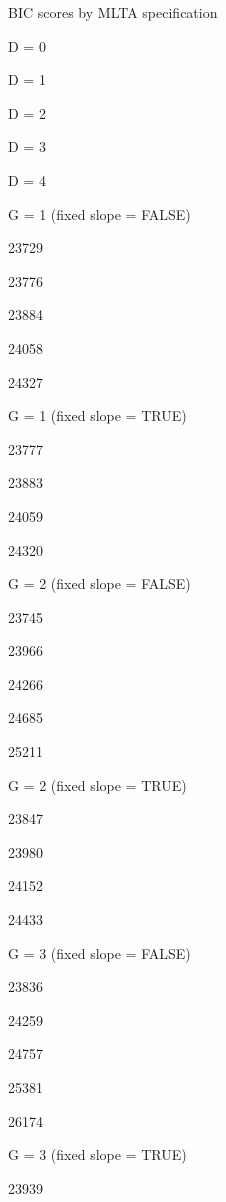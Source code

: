 \documentclass[
]{article}
\newenvironment{Shaded}{\begin{snugshade}}{\end{snugshade}}
\newcommand{\DataTypeTok}[1]{\textcolor[rgb]{0.13,0.29,0.53}{#1}}
\newcommand{\DecValTok}[1]{\textcolor[rgb]{0.00,0.00,0.81}{#1}}
\newcommand{\KeywordTok}[1]{\textcolor[rgb]{0.13,0.29,0.53}{\textbf{#1}}}
\newcommand{\NormalTok}[1]{#1}
\newcommand{\OperatorTok}[1]{\textcolor[rgb]{0.81,0.36,0.00}{\textbf{#1}}}
\newcommand{\StringTok}[1]{\textcolor[rgb]{0.31,0.60,0.02}{#1}}
\begin{document}
\begin{Shaded}
\end{Shaded}

BIC scores by MLTA specification

D = 0

D = 1

D = 2

D = 3

D = 4

G = 1 (fixed slope = FALSE)

23729

23776

23884

24058

24327

G = 1 (fixed slope = TRUE)

23777

23883

24059

24320

G = 2 (fixed slope = FALSE)

23745

23966

24266

24685

25211

G = 2 (fixed slope = TRUE)

23847

23980

24152

24433

G = 3 (fixed slope = FALSE)

23836

24259

24757

25381

26174

G = 3 (fixed slope = TRUE)

23939
\end{document}
